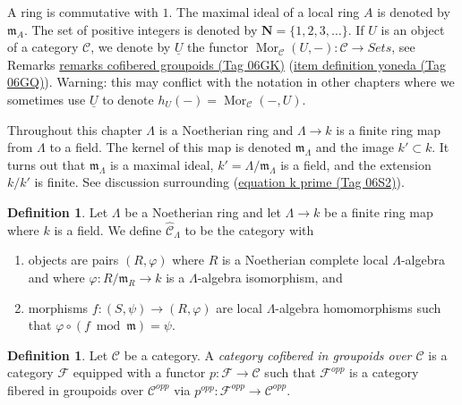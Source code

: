 \documentclass{amsart}
\theoremstyle{plain}
\theoremstyle{definition}
\newtheorem{definition}[subsection]{Definition}
\theoremstyle{remark}
\numberwithin{equation}{subsection}
\def\Mor{\mathop{\mathrm{Mor}}\nolimits}
\begin{document}
\noindent
A ring is commutative with $1$. The  maximal ideal of a local ring $A$
is denoted by $\mathfrak{m}_A$. The set of positive integers is denoted
by $\mathbf{N} = \{1, 2, 3, \ldots\}$. If $U$ is an object of a
category $\mathcal{C}$, we denote by $\underline{U}$
the functor
$\Mor_\mathcal{C}(U, -): \mathcal{C} \to \textit{Sets}$, see
Remarks \href{https://stacks.math.columbia.edu/tag/06GK}{remarks cofibered groupoids (Tag 06GK)} (\href{https://stacks.math.columbia.edu/tag/06GQ}{item definition yoneda (Tag 06GQ)}).
Warning: this may conflict with the notation in other chapters where we
sometimes use $\underline{U}$ to denote $h_U(-) = \Mor_\mathcal{C}(-, U)$.

\medskip\noindent
Throughout this chapter $\Lambda$ is a Noetherian ring and
$\Lambda \to k$ is a finite ring map from $\Lambda$ to a field.
The kernel of this map is denoted $\mathfrak m_\Lambda$ and the
image $k' \subset k$. It turns out that $\mathfrak m_\Lambda$ is
a maximal ideal, $k' = \Lambda/\mathfrak m_\Lambda$ is a field, and
the extension $k/k'$ is finite. See discussion surrounding
(\href{https://stacks.math.columbia.edu/tag/06S2}{equation k prime (Tag 06S2)}).




\begin{definition}
\label{definition-completion-CLambda}
Let $\Lambda$ be a Noetherian ring and let $\Lambda \to k$ be a finite
ring map where $k$ is a field. We define {\it $\widehat{\mathcal{C}}_\Lambda$}
to be the category with
\begin{enumerate}
\item objects are pairs $(R, \varphi)$ where $R$ is a Noetherian complete
local $\Lambda$-algebra and where $\varphi : R/\mathfrak m_R \to k$ is a
$\Lambda$-algebra isomorphism, and
\item morphisms $f : (S, \psi) \to (R, \varphi)$ are local $\Lambda$-algebra
homomorphisms such that $\varphi \circ (f \bmod \mathfrak m) = \psi$.
\end{enumerate}
\end{definition}

\begin{definition}
\label{definition-category-cofibred-groupoids}
Let $\mathcal{C}$ be a category.  A {\it category cofibered in groupoids over
$\mathcal{C}$} is a category $\mathcal{F}$ equipped with a functor
$p: \mathcal{F} \to \mathcal{C}$ such that $\mathcal{F}^{opp}$ is a category
fibered in groupoids over $\mathcal{C}^{opp}$ via
$p^{opp}: \mathcal{F}^{opp} \to \mathcal{C}^{opp}$.
\end{definition}
\end{document}
